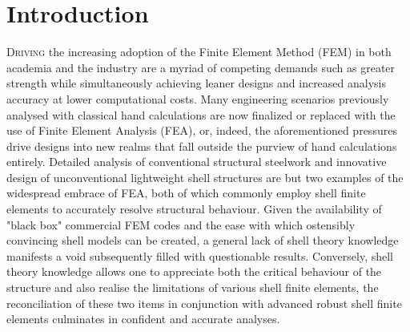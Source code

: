 


\chapter{Introduction}
\label{chap:chapter_1}

\renewcommand{\Thema}{Introduction}

\lettrine[lines=2]{D}{riving} the increasing adoption of the Finite Element Method (FEM) in both academia and the industry are a myriad of competing demands such as greater strength while simultaneously achieving leaner designs and increased analysis accuracy at lower computational costs. Many engineering scenarios previously analysed with classical hand calculations are now finalized or replaced with the use of Finite Element Analysis (FEA), or, indeed, the aforementioned pressures drive designs into new realms that fall outside the purview of hand calculations entirely. Detailed analysis of conventional structural steelwork and innovative design of unconventional lightweight shell structures are but two examples of the widespread embrace of FEA, both of which commonly employ shell finite elements to accurately resolve structural behaviour. Given the availability of "black box" commercial FEM codes and the ease with which ostensibly convincing shell models can be created, a general lack of shell theory knowledge manifests a void subsequently filled with questionable results. Conversely, shell theory knowledge allows one to appreciate both the critical behaviour of the structure and also realise the limitations of various shell finite elements, the reconciliation of these two items in conjunction with advanced robust shell finite elements culminates in confident and accurate analyses.

